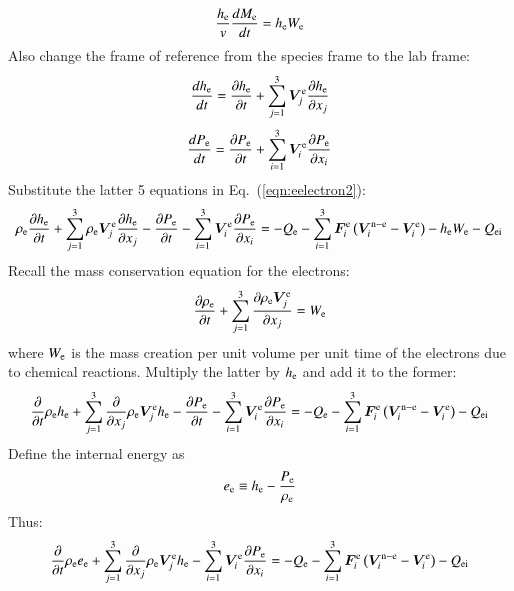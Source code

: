 \documentclass{warpdoc}
\renewcommand{\vec}[1]{\bm{#1}}
\begin{document}
%
\begin{equation}
  \frac{h_{\rm e}}{v}\frac{d M_{\rm e}}{d t} = h_{\rm e} W_{\rm e}
\end{equation}
%
Also change the frame of reference from the species frame to the lab frame:
%
\begin{equation}
\frac{d h_{\rm e}}{d t} = \frac{\partial h_{\rm e}}{\partial t} + \sum_{j=1}^3 \vec{V}^{\rm e}_j \frac{\partial h_{\rm e}}{\partial x_j}
\end{equation}
%
%
\begin{equation}
\frac{d P_{\rm e}}{d t} = \frac{\partial P_{\rm e}}{\partial t} + \sum_{i=1}^3 \vec{V}^{\rm e}_i \frac{\partial P_{\rm e}}{\partial x_i}
\end{equation}
%
Substitute the latter 5 equations in Eq.\ (\ref{eqn:eelectron2}):
%
\begin{equation}
\rho_{\rm e} \frac{\partial h_{\rm e}}{\partial t} + \sum_{j=1}^3 \rho_{\rm e} \vec{V}^{\rm e}_j \frac{\partial h_{\rm e}}{\partial x_j} 
- \frac{\partial P_{\rm e}}{\partial t} - \sum_{i=1}^3 \vec{V}^{\rm e}_i \frac{\partial P_{\rm e}}{\partial x_i}
= 
-Q_{\rm e}
-\sum_{i=1}^3 \vec{F}_i^{\rm e} \left( \vec{V}_i^{{\rm n}-{\rm e}}-\vec{V}_i^{\rm e} \right)
-h_{\rm e} W_{\rm e} - Q_{\rm ei}
\label{eqn:eelectron3}
\end{equation}
%  
Recall the mass conservation equation for the electrons:
%
\begin{equation}
\frac{\partial \rho_{\rm e}}{\partial t}+ \sum_{j=1}^3 \frac{\partial \rho_{\rm e} \vec{V}^{\rm e}_j}{\partial x_j}=W_{\rm e} 
\end{equation}
%
where $W_{\rm e}$ is the mass creation per unit volume per unit time of the electrons due to chemical reactions. Multiply the latter by $h_{\rm e}$ and add it to the former:
%
\begin{equation}
 \frac{\partial }{\partial t}\rho_{\rm e} h_{\rm e} + \sum_{j=1}^3  \frac{\partial }{\partial x_j} \rho_{\rm e} \vec{V}^{\rm e}_j h_{\rm e} 
- \frac{\partial P_{\rm e}}{\partial t} - \sum_{i=1}^3 \vec{V}^{\rm e}_i \frac{\partial P_{\rm e}}{\partial x_i}
= 
-Q_{{\rm e}}
-\sum_{i=1}^3 \vec{F}_i^{\rm e} \left( \vec{V}_i^{{\rm n}-{\rm e}}-\vec{V}_i^{\rm e} \right)
- Q_{\rm ei}
\end{equation}
%  
Define the internal energy as
%
\begin{equation}
e_{\rm e} \equiv h_{\rm e}-\frac{P_{\rm e}}{\rho_{\rm e}}
\end{equation}
%
Thus:
%
\begin{equation}
 \frac{\partial }{\partial t}\rho_{\rm e} e_{\rm e} + \sum_{j=1}^3  \frac{\partial }{\partial x_j} \rho_{\rm e} \vec{V}^{\rm e}_j h_{\rm e} 
- \sum_{i=1}^3 \vec{V}^{\rm e}_i \frac{\partial P_{\rm e}}{\partial x_i}
= 
- Q_{{\rm e}}
-\sum_{i=1}^3 \vec{F}_i^{\rm e} \left( \vec{V}_i^{{\rm n}-{\rm e}}-\vec{V}_i^{\rm e} \right)
- Q_{\rm ei}
\label{eqn:eelectron4}
\end{equation}
\end{document}
